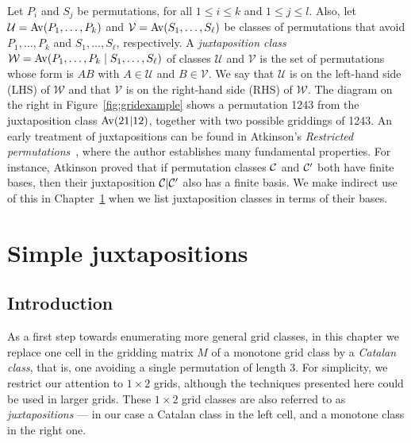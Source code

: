 \documentclass[12pt, a4paper, twoside]{report}
\begin{document}
Let $P_i$ and $S_j$ be permutations, for all $1\leq i\leq k$ and $1 \leq j \leq l$. Also, let $\mathcal{U} = \mathrm{Av}(P_1,\ldots,P_k)$ and $\mathcal{V} = \mathrm{Av}(S_1,\ldots,S_\ell)$ be  classes of permutations that avoid $P_1,\ldots, P_k$ and $S_1,\ldots,S_\ell$, respectively. A \emph{juxtaposition class} $\mathcal{W} = \mathrm{Av}(P_1,\ldots,P_k\mid S_1, \ldots, S_\ell)$ of classes $\mathcal{U}$ and $\mathcal{V}$ is the set of permutations whose form is $AB$ with $A\in \mathcal{U}$ and $B \in \mathcal{V}$. We say that $\mathcal{U}$ is on the left-hand side (LHS) of $\mathcal{W}$ and that $\mathcal{V}$ is on the right-hand side (RHS) of $\mathcal{W}$. The diagram on the right in Figure~\ref{fig:gridexample} shows a permutation 1243 from the juxtaposition class $\mathrm{Av}(21|12)$, together with two possible griddings of 1243. An early treatment of juxtapositions can be found in Atkinson's \emph{Restricted permutations}~\cite{atkinson1997restricted}, where the author establishes many fundamental properties. For instance, Atkinson proved that if permutation classes $\mathcal{C}$ and $\mathcal{C}'$ both have finite bases, then their juxtaposition $\mathcal{C}|\mathcal{C}'$ also has a finite basis. We make indirect use of this in Chapter~\ref{chap:catalanjuxt} when we list juxtaposition classes in terms of their bases.


\chapter{Simple juxtapositions}
\label{chap:catalanjuxt}
%

\section{Introduction}

As a first step towards enumerating more general grid classes, in this chapter we replace one cell in the gridding matrix $M$ of a monotone grid class by a \emph{Catalan class}, that is, one avoiding a single permutation of length 3. For simplicity, we restrict our attention to $1\times 2$ grids, although the techniques presented here could be used in larger grids. These $1\times 2$ grid classes are also referred to as \emph{juxtapositions} --- in our case a Catalan class in the left cell, and a monotone class in the right one.
\end{document}
